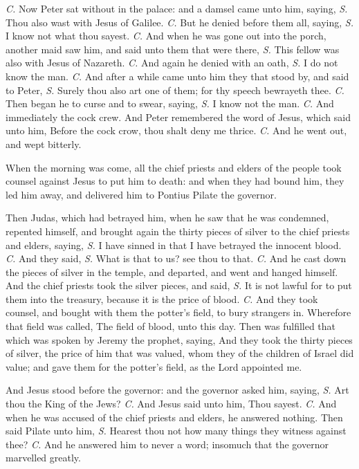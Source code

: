 \textit{C.} Now Peter sat without in the palace: and a damsel came unto him, saying, \textit{S.} Thou also wast with Jesus of Galilee. \textit{C.} But he denied before them all, saying, \textit{S.} I know not what thou sayest. \textit{C.} And when he was gone out into the porch, another maid saw him, and said unto them that were there, \textit{S.} This fellow was also with Jesus of Nazareth. \textit{C.} And again he denied with an oath, \textit{S.} I do not know the man. \textit{C.} And after a while came unto him they that stood by, and said to Peter, \textit{S.} Surely thou also art one of them; for thy speech bewrayeth thee. \textit{C.} Then began he to curse and to swear, saying, \textit{S.} I know not the man. \textit{C.} And immediately the cock crew. And Peter remembered the word of Jesus, which said unto him, {} Before the cock crow, thou shalt deny me thrice. \textit{C.} And he went out, and wept bitterly.

When the morning was come, all the chief priests and elders of the people took counsel against Jesus to put him to death: and when they had bound him, they led him away, and delivered him to Pontius Pilate the governor.

Then Judas, which had betrayed him, when he saw that he was condemned, repented himself, and brought again the thirty pieces of silver to the chief priests and elders, saying, \textit{S.} I have sinned in that I have betrayed the innocent blood. \textit{C.} And they said, \textit{S.} What is that to us? see thou to that. \textit{C.} And he cast down the pieces of silver in the temple, and departed, and went and hanged himself. And the chief priests took the silver pieces, and said, \textit{S.} It is not lawful for to put them into the treasury, because it is the price of blood. \textit{C.} And they took counsel, and bought with them the potter's field, to bury strangers in. Wherefore that field was called, The field of blood, unto this day. Then was fulfilled that which was spoken by Jeremy the prophet, saying, And they took the thirty pieces of silver, the price of him that was valued, whom they of the children of Israel did value; and gave them for the potter's field, as the Lord appointed me.

And Jesus stood before the governor: and the governor asked him, saying, \textit{S.} Art thou the King of the Jews? \textit{C.} And Jesus said unto him, {} Thou sayest. \textit{C.} And when he was accused of the chief priests and elders, he answered nothing. Then said Pilate unto him, \textit{S.} Hearest thou not how many things they witness against thee? \textit{C.} And he answered him to never a word; insomuch that the governor marvelled greatly.

